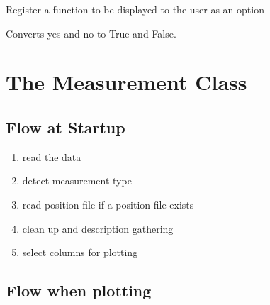 \documentclass[letterpaper,10pt,english]{sphinxmanual}
\begin{document}

\begin{fulllineitems}
\label{\detokenize{pigor:pigor.show_user}}
Register a function to be displayed to the user as an option

\end{fulllineitems}


\begin{fulllineitems}
\label{\detokenize{pigor:pigor.yn2bool}}
Converts yes and no to True and False.

\end{fulllineitems}



\chapter{The Measurement Class}
\label{\detokenize{measurement:the-measurement-class}}\label{\detokenize{measurement::doc}}

\section{Flow at Startup}
\label{\detokenize{measurement:flow-at-startup}}\begin{enumerate}
\def\theenumi{\arabic{enumi}}
\def\labelenumi{\theenumi .}
\makeatletter\def\p@enumii{\p@enumi \theenumi .}\makeatother
\item {} 
read the data

\item {} 
detect measurement type

\item {} 
read position file if a position file exists

\item {} 
clean up and description gathering

\item {} 
select columns for plotting

\end{enumerate}


\section{Flow when plotting}
\label{\detokenize{measurement:flow-when-plotting}}
\end{document}

